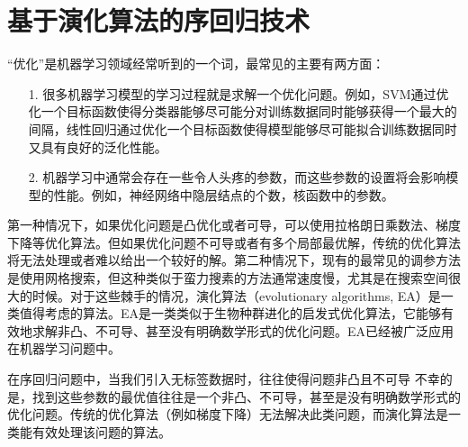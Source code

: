 \section{基于演化算法的序回归技术}
“优化”是机器学习领域经常听到的一个词，最常见的主要有两方面：
\begin{enumerate}
\item[1.]很多机器学习模型的学习过程就是求解一个优化问题。例如，SVM通过优化一个目标函数使得分类器能够尽可能分对训练数据同时能够获得一个最大的间隔，线性回归通过优化一个目标函数使得模型能够尽可能拟合训练数据同时又具有良好的泛化性能。
\item[2.]机器学习中通常会存在一些令人头疼的参数，而这些参数的设置将会影响模型的性能。例如，神经网络中隐层结点的个数，核函数中的参数。
\end{enumerate}
第一种情况下，如果优化问题是凸优化或者可导，可以使用拉格朗日乘数法、梯度下降等优化算法。但如果优化问题不可导或者有多个局部最优解，传统的优化算法将无法处理或者难以给出一个较好的解。第二种情况下，现有的最常见的调参方法是使用网格搜索，但这种类似于蛮力搜素的方法通常速度慢，尤其是在搜索空间很大的时候。对于这些棘手的情况，演化算法（evolutionary algorithms, EA）\citep{back1996evolutionary}是一类值得考虑的算法。EA是一类类似于生物种群进化的启发式优化算法，它能够有效地求解非凸、不可导、甚至没有明确数学形式的优化问题。EA已经被广泛应用在机器学习问题中\citep{liu2000evolutionary}\citep{tang2005linear}\citep{liu2000ensemble}。

在序回归问题中，当我们引入无标签数据时，往往使得问题非凸且不可导
不幸的是，找到这些参数的最优值往往是一个非凸、不可导，甚至是没有明确数学形式的优化问题。传统的优化算法（例如梯度下降）无法解决此类问题，而演化算法是一类能有效处理该问题的算法。


